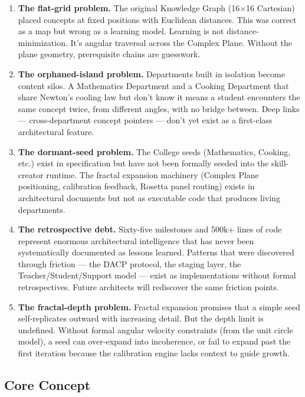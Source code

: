 \documentclass[11pt,letterpaper]{article}
\begin{document}
\begin{enumerate}
  \item \textbf{The flat-grid problem.} The original Knowledge Graph (16$\times$16 Cartesian) placed
  concepts at fixed positions with Euclidean distances. This was correct as a map but wrong as a
  learning model. Learning is not distance-minimization. It's angular traversal across the Complex
  Plane. Without the plane geometry, prerequisite chains are guesswork.

  \item \textbf{The orphaned-island problem.} Departments built in isolation become content silos.
  A Mathematics Department and a Cooking Department that share Newton's cooling law but don't know
  it means a student encounters the same concept twice, from different angles, with no bridge between.
  Deep links --- cross-department concept pointers --- don't yet exist as a first-class architectural
  feature.

  \item \textbf{The dormant-seed problem.} The College seeds (Mathematics, Cooking, etc.) exist in
  specification but have not been formally seeded into the skill-creator runtime. The fractal
  expansion machinery (Complex Plane positioning, calibration feedback, Rosetta panel routing)
  exists in architectural documents but not as executable code that produces living departments.

  \item \textbf{The retrospective debt.} Sixty-five milestones and 500k+ lines of code represent
  enormous architectural intelligence that has never been systematically documented as lessons
  learned. Patterns that were discovered through friction --- the DACP protocol, the staging layer,
  the Teacher/Student/Support model --- exist as implementations without formal retrospectives.
  Future architects will rediscover the same friction points.

  \item \textbf{The fractal-depth problem.} Fractal expansion promises that a simple seed self-replicates
  outward with increasing detail. But the depth limit is undefined. Without formal angular velocity
  constraints (from the unit circle model), a seed can over-expand into incoherence, or fail to
  expand past the first iteration because the calibration engine lacks context to guide growth.
\end{enumerate}

\subsection{Core Concept}
\end{document}

